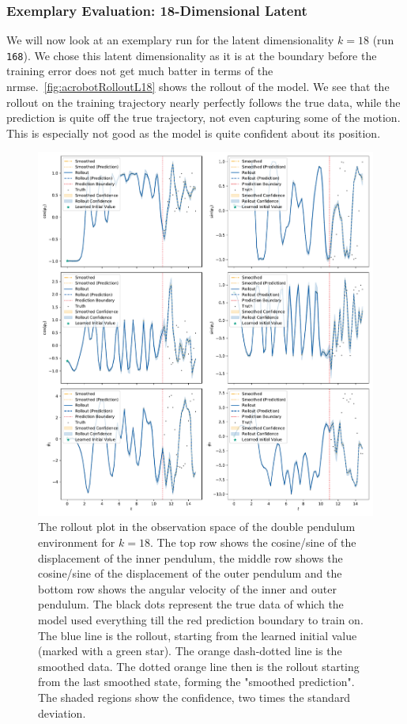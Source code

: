 		\subsubsection{Exemplary Evaluation: 18-Dimensional Latent}
			We will now look at an exemplary run for the latent dimensionality \( k = 18 \) (run \texttt{168}). We chose this latent dimensionality as it is at the boundary before the training error does not get much batter in terms of the \ac{nrmse}.~\autoref{fig:acrobotRolloutL18} shows the rollout of the model. We see that the rollout on the training trajectory nearly perfectly follows the true data, while the prediction is quite off the true trajectory, not even capturing some of the motion. This is especially not good as the model is quite confident about its position.

			\begin{figure}
				\centering
				\includegraphics[width=0.9\linewidth]{figures/results/acrobot-gym/run-latent-dim-18/rollout-observations-N0.pdf}
				\caption[Rollout of the double pendulum experiment for 18 latent dimensions]{The rollout plot in the observation space of the double pendulum environment for \(k = 18\). The top row shows the cosine/sine of the displacement of the inner pendulum, the middle row shows the cosine/sine of the displacement of the outer pendulum and the bottom row shows the angular velocity of the inner and outer pendulum. The black dots represent the true data of which the model used everything till the red prediction boundary to train on. The blue line is the rollout, starting from the learned initial value (marked with a green star). The orange dash-dotted line is the smoothed data. The dotted orange line then is the rollout starting from the last smoothed state, forming the "smoothed prediction". The shaded regions show the confidence, \ie two times the standard deviation.}
				\label{fig:acrobotRolloutL18}
			\end{figure}

